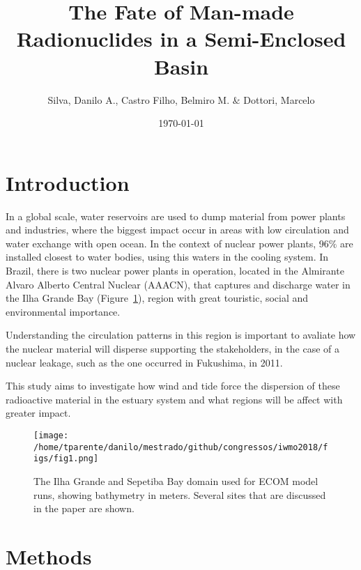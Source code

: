 \documentclass[final]{beamer}
\title
[24$^{o}$ Simpósio Internacional de Iniciação Científica da USP] %
{ %
The Fate of Man-made Radionuclides in a Semi-Enclosed Basin
}
\author{ Silva, Danilo A.\inst{1}, Castro Filho, Belmiro M.\inst{2} $\&$ Dottori, Marcelo\inst{3}
}
\institute[Instituto Oceanográfico - Universidade de São Paulo]
{
Instituto Oceanográfico da Universidade de São Paulo (IOUSP)\\ [0.2ex]
\inst{1} danilo2.silva@usp.br; \inst{2} bmcastro@usp.br; \inst{3} mdottori@usp.br
}
\date{\today}
\begin{document}
\begin{frame}
\begin{multicols}{2}

\section{Introduction}

In a global scale, water reservoirs are used to dump material from power plants and
industries, where the biggest impact occur in areas with low circulation and water
exchange with open ocean. In the context of nuclear power plants, 96$\%$ are installed
closest to water bodies, using this waters in the cooling system. In Brazil, there is
two nuclear power plants in operation, located in the Almirante Alvaro Alberto 
Central Nuclear (AAACN), that captures and discharge water in the Ilha Grande Bay
(Figure~\ref{fig:areaestudo}), region with great touristic, social and environmental importance.

Understanding the circulation patterns in this region is important to avaliate how the nuclear
material will disperse supporting the stakeholders, in the case of a nuclear leakage, such
as the one occurred in Fukushima, in 2011.

This study aims to investigate how wind and tide force the dispersion of these radioactive material in the
estuary system and what regions will be affect with greater impact.

\vspace{.1in}
\begin{figure}
\centering
\texttt{[image: /home/tparente/danilo/mestrado/github/congressos/iwmo2018/figs/fig1.png]}
\vspace{.1in}
\caption{The Ilha Grande and Sepetiba Bay domain used for ECOM model runs, showing bathymetry in meters. Several sites that are discussed in the paper are shown.}
\label{fig:areaestudo}
\end{figure}
\vspace{-.5in}
\section{Methods}


\end{multicols}
\end{frame}
\end{document}
